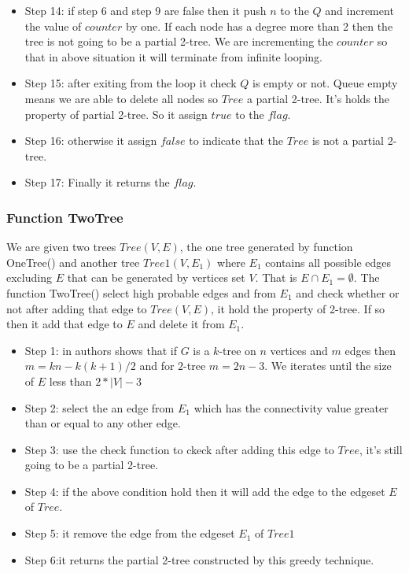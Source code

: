 \documentclass[12pt]{article}
\begin{document}
\begin{itemize}[noitemsep]
\item Step 14: if step 6 and step 9 are false then it push $n$ to the $Q$ and increment the value of $counter$ by one. If each node has a degree more than 2 then the tree is not going to be a partial 2-tree. We are incrementing the $counter$ so that in above situation it will terminate from infinite looping.
\item Step 15: after exiting from the loop it check $Q$ is empty or not. Queue empty means we are able to delete all nodes so $Tree$ a partial 2-tree. It's holds the property of partial 2-tree. So it assign $true$ to the $flag$.
\item Step 16: otherwise it assign $false$ to indicate that the $Tree$ is not a partial 2-tree.
\item Step 17: Finally it returns the $flag$.
\end{itemize}
\subsubsection{Function TwoTree}
We are given two trees $Tree(V,E)$, the one tree generated by function OneTree() and another tree $Tree1(V,E_1)$ where $E_1$ contains all possible edges excluding $E$ that can be generated by vertices set $V$. That is $E\cap E_1=\emptyset$. The function TwoTree() select high probable edges and from $E_1$ and check whether or not after adding that edge to $Tree(V,E)$, it hold the property of 2-tree. If so then it add that edge to $E$ and delete it from $E_1$.


\begin{itemize}[noitemsep]
\item Step 1: in \cite{Elmallah88partitioningthe} authors shows that if $G$ is a $k$-tree on $n$ vertices and $m$ edges then $m = kn - k(k +1)/2$ and for $2$-tree $m=2n-3$. We iterates until the size of $E$ less than $2*|V|-3$
\item Step 2: select the an edge from $E_1$ which has the connectivity value greater than or equal to any other edge.
\item Step 3: use the check function to ckeck after adding this edge to $Tree$, it's still going to be a partial 2-tree. 
\item Step 4: if the above condition hold then it will add the edge to the edgeset $E$ of $Tree$.
\item Step 5: it remove the edge from the edgeset $E_1$ of $Tree1$
\item Step 6:it returns the partial 2-tree constructed by this greedy technique.
\end{itemize}
\end{document}
